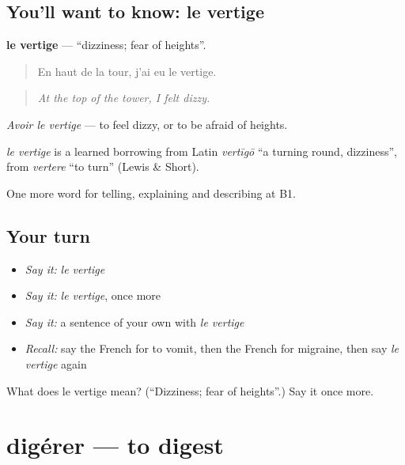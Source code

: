 \subsection*{You'll want to know: le vertige}
\textbf{le vertige} — \textquotedblleft{}dizziness; fear of heights\textquotedblright{}.

\begin{quote}
En haut de la tour, j'ai eu le vertige.
\end{quote}

\begin{quote}
\emph{At the top of the tower, I felt dizzy.}
\end{quote}

\emph{Avoir le vertige} — to feel dizzy, or to be afraid of heights.

\begin{cousinweb}
\emph{le vertige} is a learned borrowing from Latin \emph{vertīgō} \textquotedblleft{}a turning round, dizziness\textquotedblright{}, from \emph{vertere} \textquotedblleft{}to turn\textquotedblright{} (Lewis \& Short).
\end{cousinweb}

\begin{grammarlens}[title={What you've built}]
One more word for telling, explaining and describing at B1.
\end{grammarlens}

\subsection*{Your turn}
\begin{itemize}
\raggedright
  \item \emph{Say it:} \emph{le vertige}
  \item \emph{Say it:} \emph{le vertige}, once more
  \item \emph{Say it:} a sentence of your own with \emph{le vertige}
  \item \emph{Recall:} say the French for to vomit, then the French for migraine, then say \emph{le vertige} again
\end{itemize}

\begin{tcolorbox}[breakable,colback=teal!4,colframe=teal!35!black,title={Before you move on}]
What does le vertige mean? (\textquotedblleft{}Dizziness; fear of heights\textquotedblright{}.) Say it once more.
\end{tcolorbox}
\section[digérer]{digérer — to digest}

